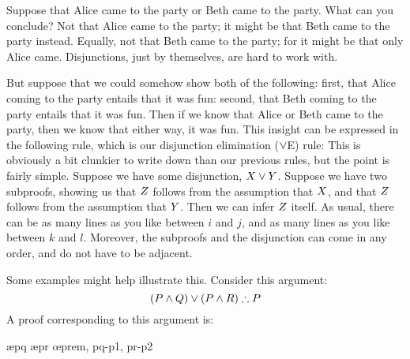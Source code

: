 Suppose that  Alice came to the party or Beth came to the party. What can you conclude? Not that Alice came to the party; it might be that Beth came to the party instead. Equally, not that Beth came to the party; for it might be that only Alice came. Disjunctions, just by themselves, are hard to work with.

But suppose that we could somehow show both of the following: first, that Alice coming to the party entails that it was fun: second, that Beth coming to the party entails that it was fun. Then if we know that Alice or Beth came to the party, then we know that either way, it was fun. This insight can be expressed in the following rule, which is our disjunction elimination ($\vee$E) rule:
This is obviously a bit clunkier to write down than our previous rules, but the point is fairly simple. Suppose we have some disjunction, $X \vee Y$. Suppose we have two
subproofs,
showing us that $Z$ follows from
the assumption that
$X$, and that $Z$ follows from
the assumption that
$Y$. Then we can infer $Z$ itself. As usual, there can be as many lines as you like between
$i$ and $j$, and as many lines as you like between $k$ and $l$.
Moreover,
the subproofs and the disjunction
can come in any order, and do not have to be adjacent.

Some examples might help illustrate this. Consider this argument:
$$(P \eand Q) \eor (P \eand R) \therefore P$$
A proof corresponding to this argument is:
	\begin{pf}
			\open
				\ae{pq}
			\close
			\open
				\ae{pr}
			\close
		\oe{prem, pq-p1, pr-p2}
	\end{pf}



